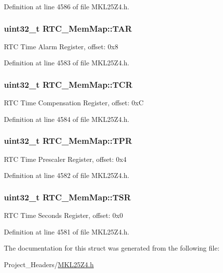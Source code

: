 Definition at line 4586 of file M\+K\+L25\+Z4.\+h.

\subsubsection[{\texorpdfstring{T\+AR}{TAR}}]{\setlength{\rightskip}{0pt plus 5cm}uint32\+\_\+t R\+T\+C\+\_\+\+Mem\+Map\+::\+T\+AR}\hypertarget{struct_r_t_c___mem_map_a500ab794376810b97e2b2e01658f330c}{}\label{struct_r_t_c___mem_map_a500ab794376810b97e2b2e01658f330c}
R\+TC Time Alarm Register, offset\+: 0x8 

Definition at line 4583 of file M\+K\+L25\+Z4.\+h.

\subsubsection[{\texorpdfstring{T\+CR}{TCR}}]{\setlength{\rightskip}{0pt plus 5cm}uint32\+\_\+t R\+T\+C\+\_\+\+Mem\+Map\+::\+T\+CR}\hypertarget{struct_r_t_c___mem_map_ab816b0540497796070202cd2f5bc10ed}{}\label{struct_r_t_c___mem_map_ab816b0540497796070202cd2f5bc10ed}
R\+TC Time Compensation Register, offset\+: 0xC 

Definition at line 4584 of file M\+K\+L25\+Z4.\+h.

\subsubsection[{\texorpdfstring{T\+PR}{TPR}}]{\setlength{\rightskip}{0pt plus 5cm}uint32\+\_\+t R\+T\+C\+\_\+\+Mem\+Map\+::\+T\+PR}\hypertarget{struct_r_t_c___mem_map_a32641b62d548255bdf2164b457a2aaeb}{}\label{struct_r_t_c___mem_map_a32641b62d548255bdf2164b457a2aaeb}
R\+TC Time Prescaler Register, offset\+: 0x4 

Definition at line 4582 of file M\+K\+L25\+Z4.\+h.

\subsubsection[{\texorpdfstring{T\+SR}{TSR}}]{\setlength{\rightskip}{0pt plus 5cm}uint32\+\_\+t R\+T\+C\+\_\+\+Mem\+Map\+::\+T\+SR}\hypertarget{struct_r_t_c___mem_map_a4ca4d2878d99736cbff0e8b107a275f2}{}\label{struct_r_t_c___mem_map_a4ca4d2878d99736cbff0e8b107a275f2}
R\+TC Time Seconds Register, offset\+: 0x0 

Definition at line 4581 of file M\+K\+L25\+Z4.\+h.



The documentation for this struct was generated from the following file\+:\begin{DoxyCompactItemize}
\item 
Project\+\_\+\+Headers/\hyperlink{_m_k_l25_z4_8h}{M\+K\+L25\+Z4.\+h}\end{DoxyCompactItemize}
